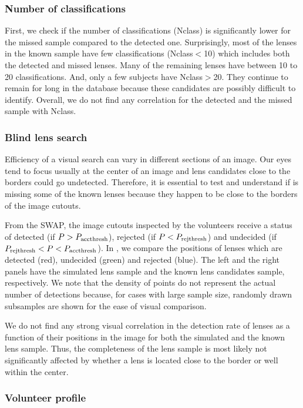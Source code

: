 \documentclass[useAMS,usenatbib,a4paper]{mn2e}
\begin{document}
\subsubsection{Number of classifications}
First, we check if the number of classifications (Nclass) is
significantly lower for the missed sample compared to the detected one.
Surprisingly, most of the lenses in the known sample have few
classifications (Nclass$<$10) which includes both the detected and
missed lenses. Many of the remaining lenses have between 10 to 20
classifications. And, only a few subjects have Nclass$>$20. They
continue to remain for long in the database because these candidates are
possibly difficult to identify. Overall, we do not find any correlation
for the detected and the missed sample with Nclass.

\subsubsection{Blind lens search}
Efficiency of a visual search can vary in different sections of an
image. Our eyes tend to focus usually at the center of an image and lens
candidates close to the borders could go undetected. Therefore, it is
essential to test and understand if \sw is missing some of the known lenses
because they happen to be close to the borders of the image cutouts.

From the SWAP, the image cutouts inspected by the \sw volunteers receive
a status of detected (if $P>P_{\rm acc thresh}$), rejected (if
$P<P_{\rm rej thresh}$) and undecided (if $P_{\rm rej thresh}< P <
P_{\rm acc thresh}$). In , we compare the positions
of lenses which are detected (red), undecided (green) and rejected
(blue). The left and the right panels have the simulated lens sample and
the known lens candidates sample, respectively. We note that the density
of points do not represent the actual number of detections because, for
cases with large sample size, randomly drawn subsamples are shown for
the ease of visual comparison.

We do not find any strong visual correlation in the detection rate of
lenses as a function of their positions in the image for both the
simulated and the known lens sample. Thus, the completeness of the lens
sample is most likely not significantly affected by whether a lens is
located close to the border or well within the center.

\subsubsection{Volunteer profile}
\end{document}
